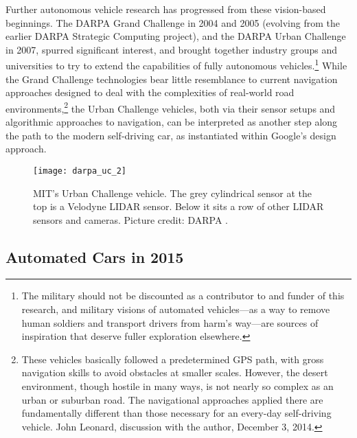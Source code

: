 

Further autonomous vehicle research has progressed from
these vision-based beginnings. The
DARPA Grand Challenge in 2004 and 2005 (evolving from the earlier
  DARPA Strategic Computing project), and the DARPA Urban Challenge 
in 2007, spurred significant interest, and brought together industry
groups and universities to 
try to extend the capabilities of fully autonomous vehicles.\footnote{The
military should not be discounted as a contributor to and funder of
  this research, and military visions of automated vehicles---as a way
  to remove human soldiers and transport drivers from harm's way---are
  sources of inspiration that deserve fuller
  exploration elsewhere.} While the
Grand Challenge technologies bear little resemblance to current
navigation approaches designed to deal with the complexities of
real-world road environments,\footnote{These vehicles basically
  followed a predetermined GPS path, with gross navigation skills to
  avoid obstacles at smaller scales. However, the desert environment,
  though hostile in many ways, is not nearly so complex as an urban or
suburban road. The navigational approaches applied there are
fundamentally different than those necessary for an every-day
self-driving vehicle. John Leonard,
  discussion with the author, December 3, 2014.} the Urban Challenge
vehicles, both via their sensor setups and algorithmic approaches to
navigation, can be interpreted as another step along the path to the
modern self-driving car, as instantiated within Google's design
approach. 

\begin{figure}[t]
  \begin{center}
  \texttt{[image: darpa\_uc\_2]}
  \end{center}
  \caption{MIT's Urban Challenge vehicle. The grey cylindrical sensor
    at the top is a Velodyne LIDAR sensor. Below it sits a row of other
    LIDAR sensors and cameras. Picture credit: DARPA \cite{DARPAUC}.}
\end{figure}

\subsection{Automated Cars in 2015}

